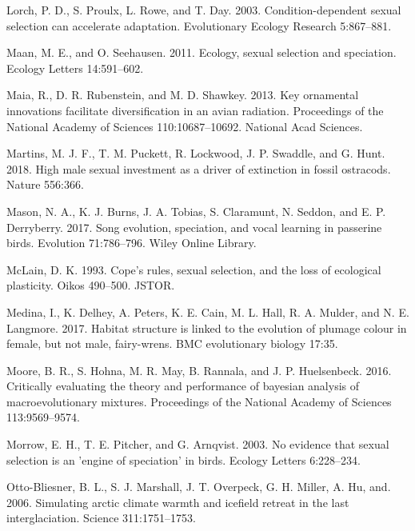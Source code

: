 \documentclass[]{article}
\begin{document}
\leavevmode\hypertarget{ref-Lorch_2003}{}%
Lorch, P. D., S. Proulx, L. Rowe, and T. Day. 2003. Condition-dependent
sexual selection can accelerate adaptation. Evolutionary Ecology
Research 5:867--881.

\leavevmode\hypertarget{ref-Maan_2011}{}%
Maan, M. E., and O. Seehausen. 2011. Ecology, sexual selection and
speciation. Ecology Letters 14:591--602.

\leavevmode\hypertarget{ref-Maia_2013}{}%
Maia, R., D. R. Rubenstein, and M. D. Shawkey. 2013. Key ornamental
innovations facilitate diversification in an avian radiation.
Proceedings of the National Academy of Sciences 110:10687--10692.
National Acad Sciences.

\leavevmode\hypertarget{ref-Martins_2018}{}%
Martins, M. J. F., T. M. Puckett, R. Lockwood, J. P. Swaddle, and G.
Hunt. 2018. High male sexual investment as a driver of extinction in
fossil ostracods. Nature 556:366.

\leavevmode\hypertarget{ref-Mason_2017}{}%
Mason, N. A., K. J. Burns, J. A. Tobias, S. Claramunt, N. Seddon, and E.
P. Derryberry. 2017. Song evolution, speciation, and vocal learning in
passerine birds. Evolution 71:786--796. Wiley Online Library.

\leavevmode\hypertarget{ref-Mclain_1993}{}%
McLain, D. K. 1993. Cope's rules, sexual selection, and the loss of
ecological plasticity. Oikos 490--500. JSTOR.

\leavevmode\hypertarget{ref-Medina_2017}{}%
Medina, I., K. Delhey, A. Peters, K. E. Cain, M. L. Hall, R. A. Mulder,
and N. E. Langmore. 2017. Habitat structure is linked to the evolution
of plumage colour in female, but not male, fairy-wrens. BMC evolutionary
biology 17:35.

\leavevmode\hypertarget{ref-Moore_2016}{}%
Moore, B. R., S. Hohna, M. R. May, B. Rannala, and J. P. Huelsenbeck.
2016. Critically evaluating the theory and performance of bayesian
analysis of macroevolutionary mixtures. Proceedings of the National
Academy of Sciences 113:9569--9574.

\leavevmode\hypertarget{ref-Morrow_Speciation_2003}{}%
Morrow, E. H., T. E. Pitcher, and G. Arnqvist. 2003. No evidence that
sexual selection is an 'engine of speciation' in birds. Ecology Letters
6:228--234.

\leavevmode\hypertarget{ref-Otto-Bliesner_2006}{}%
Otto-Bliesner, B. L., S. J. Marshall, J. T. Overpeck, G. H. Miller, A.
Hu, and. 2006. Simulating arctic climate warmth and icefield retreat in
the last interglaciation. Science 311:1751--1753.
\end{document}
